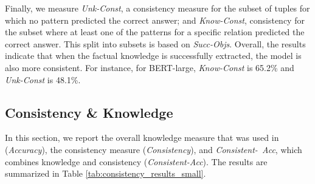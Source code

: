 Finally, we measure \emph{Unk-Const}, a consistency measure for the subset of tuples
for which no pattern predicted the correct answer; %
and \emph{Know-Const}, consistency for the subset where
at least one of the patterns for a specific
relation predicted the correct answer.
This split into subsets is
based on \textit{Succ-Objs}.
Overall, the results indicate that when the factual knowledge is successfully extracted, the model is also more consistent.
For instance, for BERT-large, \textit{Know-Const}  is 65.2\% and \textit{Unk-Const} is 48.1\%. 




\subsection{Consistency \& Knowledge}
 In this section, we report
the overall knowledge measure that was used in \citet{lama} (\textit{Accuracy}),
the consistency measure (\textit{Consistency}),
and \textit{Consistent-\
  Acc}, which combines knowledge and consistency  (\textit{Consistent-Acc}). %
The results are summarized in Table
\ref{tab:consistency_results_small}.

